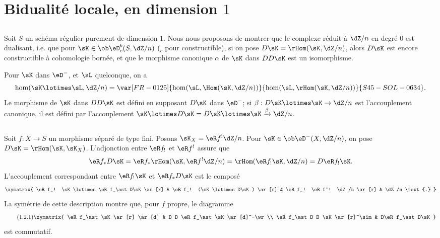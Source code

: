 \section{Bidualité locale, en dimension \texorpdfstring{$1$}{1}}\label{V:1}





\subsection{}\label{V:1-1}

Soit $S$ un schéma régulier purement de dimension $1$. Nous nous proposons 
de montrer que le complexe réduit à $\dZ/n$ en degré $0$ est 
dualisant, i.e. que pour $\sK\in \ob\eD_c^b(S,\dZ/n)$ (${}_c$ pour 
constructible), si on pose $D\sK=\rHom(\sK,\dZ/n)$, alors $D\sK$ est encore 
constructible à cohomologie bornée, et que le morphisme canonique $\alpha$ 
de $\sK$ dans $D D\sK$ est un isomorphisme. 

Pour $\sK$ dans $\eD^-$, et $\sL$ quelconque, on a 
\[
  \hom(\sK\lotimes \sL,\dZ/n) = \var[FR-0125]{\hom(\sL,\Hom(\sK,\dZ/n))}{\hom(\sL,\rHom(\sK,\dZ/n))}{S45-SOL-0634} \text{.}
\]
Le morphisme de $\sK$ dans $DD\sK$ est défini en supposant $D\sK$ dans 
$\eD^-$; si $\beta:D\sK\lotimes\sK\to \dZ/n$ est l'accouplement canonique, il 
est défini par l'accouplement 
$\sK\lotimes D\sK=D\sK\lotimes \sK \xrightarrow\beta \dZ/n$. 





\subsection{}\label{V:1-2}

Soit $f:X\to S$ un morphisme séparé de type fini. Posons 
$\sK_X=\eR f^!\dZ/n$. Pour $\sK\in \ob\eD^-(X,\dZ/n)$, on pose 
$D\sK = \rHom(\sK,\sK_X)$. L'adjonction entre $\eR f_!$ et $\eR f^!$ 
assure que
\[
  \eR f_\ast D\sK = \eR f_\ast \rHom(\sK,\eR f^! \dZ/n) = \rHom(\eR f_! \sK,\dZ/n) = D\eR f_! \sK \text{.}
\]
L'accouplement correspondant entre $\eR f_! \sK$ et $\eR f_\ast D\sK$ est le composé 
\[\xymatrix{
  \eR f_! \sK\lotimes \eR f_\ast D\sK \ar[r] 
    & \eR f_! (\sK\lotimes D\sK) \ar[r] 
    & \eR f_! \eR f^! \dZ/n \ar[r] 
    & \dZ/n \text{.}
}\]
La symétrie de cette description montre que, pour $f$ propre, le diagramme 
\begin{equation*}\tag{1.2.1}\label{V:eq:1-2-1}
\xymatrix{
  \eR f_\ast \sK \ar[r] \ar[d] 
    & D D \eR f_\ast \sK \ar[d]^-\wr \\
  \eR f_\ast D D \sK \ar[r]^\sim 
    & D\eR f_\ast D\sK
}
\end{equation*}
est commutatif. 

